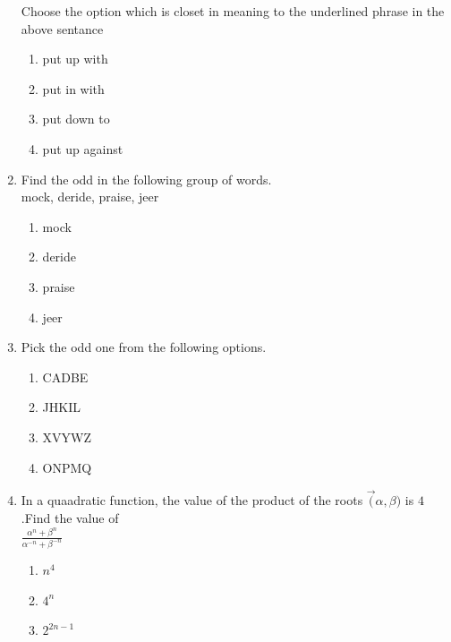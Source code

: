 \documentclass[journal,12pt,twocolumn]{IEEEtran}
\theoremstyle{remark}
\begin{document}
\begin{enumerate}
    Choose the option which is closet in meaning to the underlined phrase in the above sentance\\
    \begin{enumerate}
        \item put up with\\
        \item put in with\\
        \item put down to\\
        \item put up against
    \end{enumerate}
    \item Find the odd in the following group of words.\\
                     mock, deride, praise, jeer\\
    \begin{enumerate}
        \item mock\\
        \item deride\\
        \item praise\\
        \item jeer
    \end{enumerate}
    \item Pick the odd one from the following options.\\
    \begin{enumerate}
    \item CADBE\\
    \item JHKIL\\
    \item XVYWZ\\
    \item ONPMQ
    \end{enumerate}
    \item In a quaadratic function, the value of the product of the roots $\vec(\alpha,\beta)$ is $4$.Find the value of\\
                              $\frac{\alpha^{n} + \beta^{n}}{\alpha^{-n} + \beta^{-n}}$\\
    \begin{enumerate}
        \item$n^{4}$\\
        \item$4^{n}$\\
        \item$2^{2n-1}$\\

\end{enumerate}
\end{enumerate}
\end{document}
